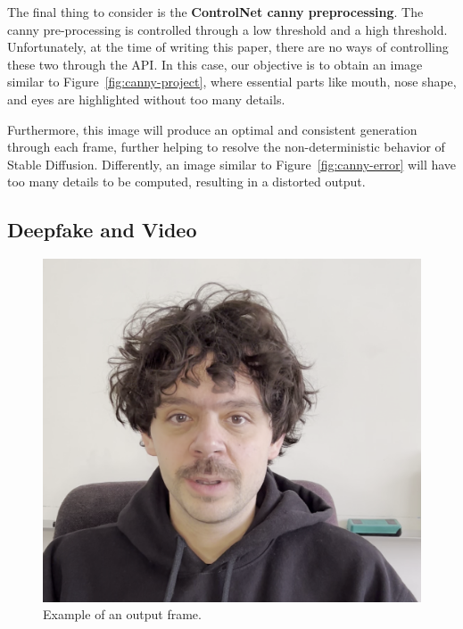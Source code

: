 \documentclass[preprint]{elsarticle}
\begin{document}
The final thing to consider is the \textbf{ControlNet canny preprocessing}. 
The canny pre-processing is controlled through a low threshold and a high threshold. 
Unfortunately, at the time of writing this paper, there are no ways of  controlling these two through the API.
In this case, our objective is to obtain an image similar to Figure~\ref{fig:canny-project},  where essential parts like mouth, nose shape, and eyes are highlighted without too many details. 

Furthermore, this image will produce an optimal and consistent generation through each frame, further helping to resolve the non-deterministic behavior of Stable Diffusion. Differently, an image similar to Figure~\ref{fig:canny-error} will have too many details to be computed, 
resulting in a distorted output.



\subsection{Deepfake and Video}

\begin{figure}[t]
	\centering
	\includegraphics[scale=0.15, keepaspectratio]{img/project_img/output.png}
	\caption{Example of an output frame.}
	\label{fig:output}
\end{figure}
\end{document}
